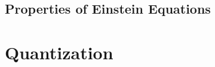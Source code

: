 \documentclass[a4paper,11pt]{article}
\numberwithin{equation}{section}
\theoremstyle{definition}
\begin{document}
\subsection{Properties of Einstein Equations}

\newpage



\section{Quantization}

\newpage
\end{document}
